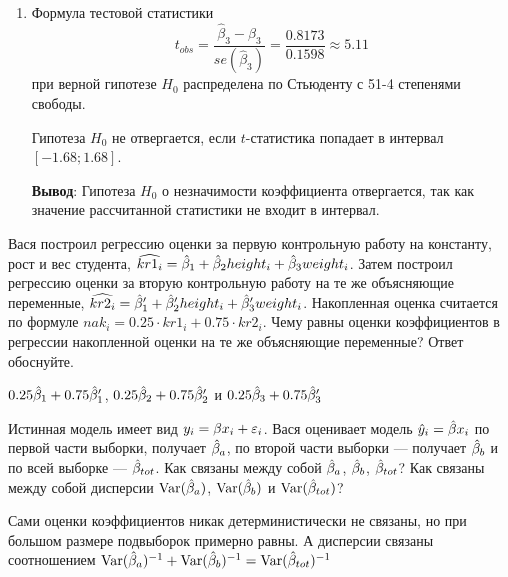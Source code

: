 \begin{problem}
\begin{sol}
\begin{enumerate}
    
    \item 
    Формула тестовой статистики 
\[
t_{obs} = \frac{\hat{\beta}_3-\beta_3}{se(\hat{\beta}_3)}= \frac{0.8173}{0.1598}\approx 5.11
\]
при верной гипотезе $H_0$ распределена по Стьюденту с 51-4 степенями свободы. 
    
Гипотеза $H_0$ не отвергается, если $t$-статистика попадает в интервал $[-1.68; 1.68]$.
    
    \textbf{Вывод}: Гипотеза $H_0$ о незначимости коэффициента отвергается, так как значение рассчитанной статистики не входит в интервал. 
\end{enumerate}
\end{sol}
\end{problem}




\begin{problem}
Вася построил регрессию оценки за первую контрольную работу на константу, рост и вес студента, $\widehat{kr1_i}=\hat{\beta}_1 + \hat{\beta}_2 height_i + \hat{\beta}_3 weight_i$. Затем построил регрессию оценки за вторую контрольную работу на те же объясняющие переменные, $\widehat{kr2_i}=\hat{\beta}_1' + \hat{\beta}_2' height_i + \hat{\beta}_3' weight_i$. Накопленная оценка считается по формуле $nak_i=0.25 \cdot kr1_i + 0.75 \cdot kr2_i$. Чему равны оценки коэффициентов в регрессии накопленной оценки на те же объясняющие переменные? Ответ обоснуйте.

\begin{sol}
$0.25\hat{\beta}_1+0.75\hat{\beta}_1'$, $0.25\hat{\beta}_2+0.75\hat{\beta}_2'$ и $0.25\hat{\beta}_3+0.75\hat{\beta}_3'$
\end{sol}
\end{problem}


\begin{problem}
Истинная модель имеет вид $y_i=\beta x_i +\varepsilon_i$. Вася оценивает модель $\hat{y}_i=\hat{\beta} x_i$ по первой части выборки, получает $\hat{\beta}_a$, по второй части выборки — получает $\hat{\beta}_b$ и по всей выборке — $\hat{\beta}_{tot}$. Как связаны между собой $\hat{\beta}_{a}$, $\hat{\beta}_{b}$, $\hat{\beta}_{tot}$? Как связаны между собой дисперсии $\operatorname{Var}(\hat{\beta}_a)$,  $\operatorname{Var}(\hat{\beta}_b)$ и  $\operatorname{Var}(\hat{\beta}_{tot})$?


\begin{sol}
Сами оценки коэффициентов никак детерминистически не связаны, но при большом размере подвыборок примерно равны. А дисперсии связаны соотношением $\operatorname{Var}(\hat{\beta}_a)^{-1}+\operatorname{Var}(\hat{\beta}_b)^{-1}=\operatorname{Var}(\hat{\beta}_{tot})^{-1}$
\end{sol}
\end{problem}


